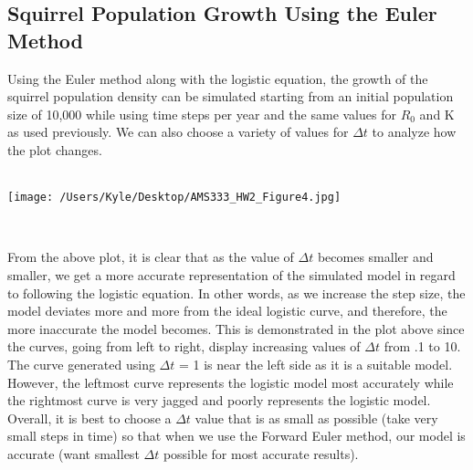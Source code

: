 \documentclass[12pt]{article}
\begin{document}

\subsection*{Squirrel Population Growth Using the Euler Method}
Using the Euler method along with the logistic equation, the growth of the squirrel population density can be simulated starting from an initial population size of 10,000 while using time steps per year and the same values for $R_0$ and K as used previously. We can also choose a variety of values for $\Delta t$ to analyze how the plot changes.\\\


\begin{center}
   \texttt{[image: /Users/Kyle/Desktop/AMS333\_HW2\_Figure4.jpg]}
\end{center}\

From the above plot, it is clear that as the value of $\Delta t$ becomes smaller and smaller, we get a more accurate representation of the simulated model in regard to following the logistic equation. In other words, as we increase the step size, the model deviates more and more from the ideal logistic curve, and therefore, the more inaccurate the model becomes. This is demonstrated in the plot above since the curves, going from left to right, display increasing values of $\Delta t$ from .1 to 10. The curve generated using $\Delta t$ = 1 is near the left side as it is a suitable model. However, the leftmost curve represents the logistic model most accurately while the rightmost curve is very jagged and poorly represents the logistic model. Overall, it is best to choose a $\Delta t$ value that is as small as possible (take very small steps in time) so that when we use the Forward Euler method, our model is accurate (want smallest $\Delta t$ possible for most accurate results).\\\
\end{document}
